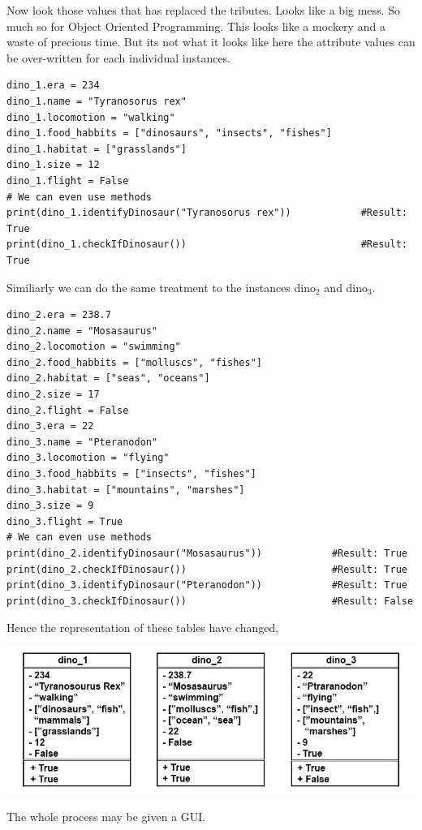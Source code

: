 \documentclass[11pt]{article}
\begin{document}
Now look those values that has replaced the   tributes. Looks like a big mess. So much so for Object Oriented Programming. This looks like a mockery and a waste of precious time. But its not what it looks like here the attribute values can be over-written for each individual instances.
\begin{verbatim}
dino_1.era = 234
dino_1.name = "Tyranosorus rex"
dino_1.locomotion = "walking"
dino_1.food_habbits = ["dinosaurs", "insects", "fishes"]
dino_1.habitat = ["grasslands"]
dino_1.size = 12
dino_1.flight = False
# We can even use methods
print(dino_1.identifyDinosaur("Tyranosorus rex"))            #Result: True
print(dino_1.checkIfDinosaur())                              #Result: True
\end{verbatim}

Similiarly we can do the same treatment to the instances dino\(_{\text{2}}\) and dino\(_{\text{3}}\).


\begin{verbatim}
dino_2.era = 238.7
dino_2.name = "Mosasaurus"
dino_2.locomotion = "swimming"
dino_2.food_habbits = ["molluscs", "fishes"]
dino_2.habitat = ["seas", "oceans"]
dino_2.size = 17
dino_2.flight = False
dino_3.era = 22
dino_3.name = "Pteranodon"
dino_3.locomotion = "flying"
dino_3.food_habbits = ["insects", "fishes"]
dino_3.habitat = ["mountains", "marshes"]
dino_3.size = 9
dino_3.flight = True
# We can even use methods
print(dino_2.identifyDinosaur("Mosasaurus"))            #Result: True
print(dino_2.checkIfDinosaur())                         #Result: True
print(dino_3.identifyDinosaur("Pteranodon"))            #Result: True
print(dino_3.checkIfDinosaur())                         #Result: False
\end{verbatim}

Hence the representation of these tables have changed,

\begin{center}
\includegraphics[width=.9\linewidth]{./img/dino_uml.jpg}
\end{center}
The whole process may be given a GUI.
\end{document}
